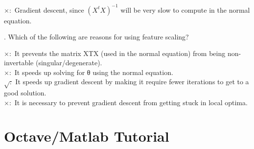 \documentclass[11pt,a4paper]{article}
\begin{document}
$\times:$  Gradient descent, since $(X^{t}X)^{-1}$ will be very slow to compute in the normal equation.

\smallskip \smallskip
{}. Which of the following are reasons for using feature scaling?

$\times:$ It prevents the matrix XTX (used in the normal equation) from being non-invertable (singular/degenerate).\\
$\times:$ It speeds up solving for θ using the normal equation.\\
$\surd:$ It speeds up gradient descent by making it require fewer iterations to get to a good solution.\\
$\times:$ It is necessary to prevent gradient descent from getting stuck in local optima.\\


\section{Octave/Matlab Tutorial}
\end{document}
